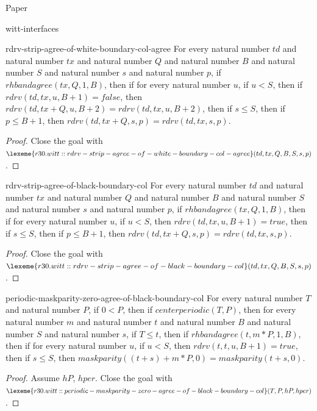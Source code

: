 \begin{lexlean}{Paper}
\begin{section}{witt-interfaces}
  \begin{theorem}{rdrv-strip-agree-of-white-boundary-col-agree}
  For every natural number \(td\) and natural number \(tx\) and natural number \(Q\) and natural number \(B\) and natural number \(S\) and natural number \(s\) and natural number \(p\), if \(rhbandagree(tx, Q, 1, B)\), then if for every natural number \(u\), if \(u < S\), then if \(rdrv(td, tx, u, B + 1) = false\), then \(rdrv(td, tx + Q, u, B + 2) = rdrv(td, tx, u, B + 2)\), then if \(s ≤ S\), then if \(p ≤ B + 1\), then \(rdrv(td, tx + Q, s, p) = rdrv(td, tx, s, p)\).
  \begin{proof}
  Close the goal with \(\lexeme{r30.witt::rdrv-strip-agree-of-white-boundary-col-agree}(td, tx, Q, B, S, s, p)\).
  \end{proof}
  \end{theorem}

  \begin{theorem}{rdrv-strip-agree-of-black-boundary-col}
  For every natural number \(td\) and natural number \(tx\) and natural number \(Q\) and natural number \(B\) and natural number \(S\) and natural number \(s\) and natural number \(p\), if \(rhbandagree(tx, Q, 1, B)\), then if for every natural number \(u\), if \(u < S\), then \(rdrv(td, tx, u, B + 1) = true\), then if \(s ≤ S\), then if \(p ≤ B + 1\), then \(rdrv(td, tx + Q, s, p) = rdrv(td, tx, s, p)\).
  \begin{proof}
  Close the goal with \(\lexeme{r30.witt::rdrv-strip-agree-of-black-boundary-col}(td, tx, Q, B, S, s, p)\).
  \end{proof}
  \end{theorem}

  \begin{theorem}{periodic-maskparity-zero-agree-of-black-boundary-col}
  For every natural number \(T\) and natural number \(P\), if \(0 < P\), then if \(centerperiodic(T, P)\), then for every natural number \(m\) and natural number \(t\) and natural number \(B\) and natural number \(S\) and natural number \(s\), if \(T ≤ t\), then if \(rhbandagree(t, m * P, 1, B)\), then if for every natural number \(u\), if \(u < S\), then \(rdrv(t, t, u, B + 1) = true\), then if \(s ≤ S\), then \(maskparity((t + s) + m * P, 0) = maskparity(t + s, 0)\).
  \begin{proof}
  Assume \(hP\), \(hper\).
  Close the goal with \(\lexeme{r30.witt::periodic-maskparity-zero-agree-of-black-boundary-col}(T, P, hP, hper)\).
  \end{proof}
  \end{theorem}


\end{section}
\end{lexlean}
